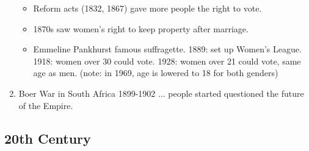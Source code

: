 \documentclass{amsart}
\begin{document}
\begin{enumerate}
		\begin{itemize}
			\item Reform acts (1832, 1867) gave more people the right to vote. 
			\item 1870s saw women's right to keep property after marriage. 
			\item Emmeline Pankhurst famous suffragette. 1889: set up Women's League. 1918: women over 30 could vote. 1928: women over 21 could vote, same age as men. (note: in 1969, age is lowered to 18 for both genders)
		\end{itemize}		 
	\item Boer War in South Africa 1899-1902 ... people started questioned the future of the Empire.  
\end{enumerate}



\subsection{20th Century}
\end{document}
